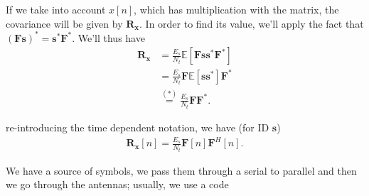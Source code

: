 \documentclass[a4paper, 12pt]{book}
\begin{document}
If we take into account $x[n]$, which has multiplication with the matrix, the covariance will be given by $\mathbf{R_x}$.
In order to find its value, we'll apply the fact that $(\mathbf{F}\mathbf{s})^* = \mathbf{s}^*\mathbf{F}^*$.
We'll thus have
\begin{align}
\mathbf{R_x} &= \frac{E_s}{N_t} \mathbb{E}[\mathbf{F}\mathbf{s}\mathbf{s}^*\mathbf{F}^*] \nonumber \\
&= \frac{E_s}{N_t} \mathbf{F} \mathbb{E}[\mathbf{s}\mathbf{s}^*] \mathbf{F}^* \nonumber \\
&\overset{(*)}{=} \frac{E_s}{N_t} \mathbf{F} \mathbf{F}^*. \nonumber
\end{align}

re-introducing the time dependent notation, we have (for ID $\mathbf{s}$)
\begin{align}
\mathbf{R_x}[n] = \frac{E_s}{N_t} \mathbf{F}[n]\mathbf{F}^H[n]. \tag{2.101}
\end{align}

\noindent{}

We have a source of symbols, we pass them through a serial to parallel and then we go through the antennas; usually, we use a code



\begin{center}
\end{center}
\end{document}
